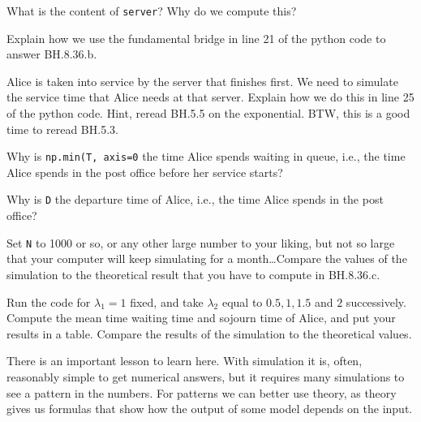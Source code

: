 \documentclass[assignments]{subfiles}
\begin{document}
\begin{exercise}
What is the content of \texttt{server}? Why do we compute this?
\begin{solution}
\end{solution}
\end{exercise}

\begin{exercise}
Explain how we use the fundamental bridge in line 21 of the python code to answer BH.8.36.b.
\begin{solution}
\end{solution}
\end{exercise}


\begin{exercise}
Alice is taken into service by the server that finishes first.
We need to simulate the service time that Alice needs at that server.
Explain how we do this in line 25 of the python code. Hint, reread BH.5.5 on the exponential. BTW, this is a good time to reread BH.5.3.
\begin{solution}
\end{solution}
\end{exercise}

\begin{exercise}
Why is \texttt{np.min(T, axis=0} the time Alice spends waiting in queue, i.e., the time Alice spends in the post office before her service starts?
\begin{solution}
\end{solution}
\end{exercise}


\begin{exercise}
Why is \texttt{D} the departure time of Alice, i.e., the time Alice spends in the post office?
\begin{solution}
\end{solution}
\end{exercise}


\begin{exercise}
Set \texttt{N} to 1000 or so, or any other large number to your liking, but not so large that your computer will keep simulating for a month\ldots Compare the values of the simulation to the theoretical result that you have to compute in BH.8.36.c.
\begin{solution}
\end{solution}
\end{exercise}


\begin{exercise}
Run the code for $\lambda_{1}=1$ fixed, and take $\lambda_{2}$ equal to $0.5, 1, 1.5$ and $2$ successively. Compute the mean time waiting time and  sojourn time of Alice, and put your results in a table. Compare the results of the simulation to the theoretical values.
\begin{solution}
\end{solution}
\end{exercise}

There is an important lesson to learn here.
With simulation it is, often, reasonably simple to get numerical answers, but it requires many simulations to see a pattern in the numbers.
For patterns we can better use theory, as theory gives us formulas that show how the output of some model depends on the input.
\end{document}
